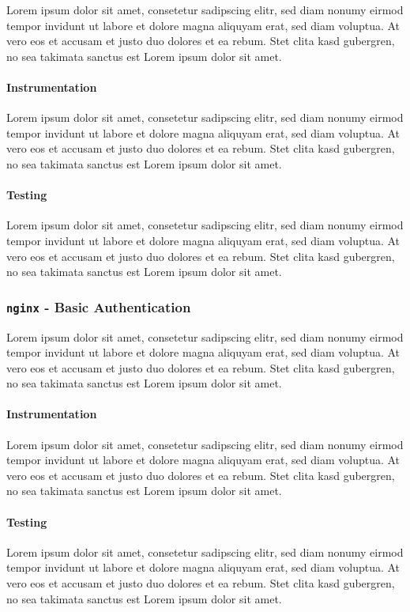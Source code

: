 Lorem ipsum dolor sit amet, consetetur sadipscing elitr, sed diam nonumy eirmod
tempor invidunt ut labore et dolore magna aliquyam erat, sed diam voluptua. At
vero eos et accusam et justo duo dolores et ea rebum. Stet clita kasd gubergren,
no sea takimata sanctus est Lorem ipsum dolor sit amet.

\paragraph{Instrumentation} Lorem ipsum dolor sit amet, consetetur sadipscing
elitr, sed diam nonumy eirmod tempor invidunt ut labore et dolore magna
aliquyam erat, sed diam voluptua. At vero eos et accusam et justo duo dolores
et ea rebum. Stet clita kasd gubergren, no sea takimata sanctus est Lorem ipsum
dolor sit amet.

\paragraph{Testing} Lorem ipsum dolor sit amet, consetetur sadipscing
elitr, sed diam nonumy eirmod tempor invidunt ut labore et dolore magna
aliquyam erat, sed diam voluptua. At vero eos et accusam et justo duo dolores
et ea rebum. Stet clita kasd gubergren, no sea takimata sanctus est Lorem ipsum
dolor sit amet.

\subsubsection{\texttt{nginx} - Basic Authentication}

Lorem ipsum dolor sit amet, consetetur sadipscing elitr, sed diam nonumy eirmod
tempor invidunt ut labore et dolore magna aliquyam erat, sed diam voluptua. At
vero eos et accusam et justo duo dolores et ea rebum. Stet clita kasd gubergren,
no sea takimata sanctus est Lorem ipsum dolor sit amet.

\paragraph{Instrumentation} Lorem ipsum dolor sit amet, consetetur sadipscing
elitr, sed diam nonumy eirmod tempor invidunt ut labore et dolore magna
aliquyam erat, sed diam voluptua. At vero eos et accusam et justo duo dolores
et ea rebum. Stet clita kasd gubergren, no sea takimata sanctus est Lorem ipsum
dolor sit amet.

\paragraph{Testing} Lorem ipsum dolor sit amet, consetetur sadipscing
elitr, sed diam nonumy eirmod tempor invidunt ut labore et dolore magna
aliquyam erat, sed diam voluptua. At vero eos et accusam et justo duo dolores
et ea rebum. Stet clita kasd gubergren, no sea takimata sanctus est Lorem ipsum
dolor sit amet.

